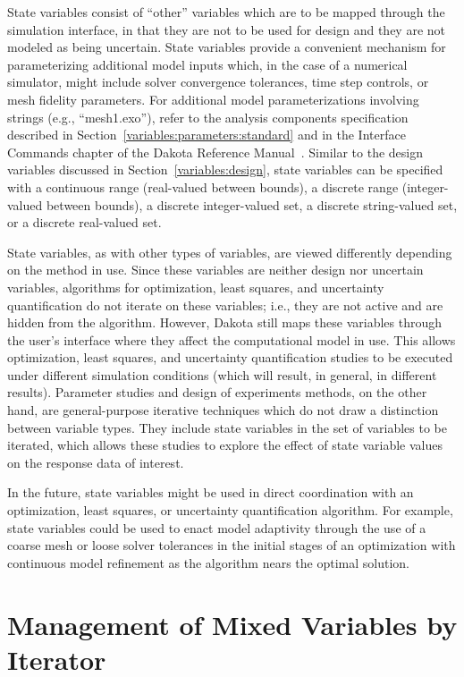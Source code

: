 State variables consist of ``other'' variables which are to be mapped
through the simulation interface, in that they are not to be used for
design and they are not modeled as being uncertain. State variables
provide a convenient mechanism for parameterizing additional model
inputs which, in the case of a numerical simulator, might include
solver convergence tolerances, time step controls, or mesh fidelity
parameters. For additional model parameterizations involving strings
(e.g., ``mesh1.exo''), refer to the analysis components specification
described in Section~\ref{variables:parameters:standard} and in the
Interface Commands chapter of the Dakota Reference
Manual~\cite{RefMan}.  Similar to the design variables discussed in
Section~\ref{variables:design}, state variables can be specified with
a continuous range (real-valued between bounds), a discrete range
(integer-valued between bounds), a discrete integer-valued set, a
discrete string-valued set, or a discrete real-valued set.

State variables, as with other types of variables, are viewed
differently depending on the method in use. Since these variables are
neither design nor uncertain variables, algorithms for optimization,
least squares, and uncertainty quantification do not iterate on these
variables; i.e., they are not active and are hidden from the
algorithm. However, Dakota still maps these variables through the
user's interface where they affect the computational model in use.
This allows optimization, least squares, and uncertainty
quantification studies to be executed under different simulation
conditions (which will result, in general, in different results).
Parameter studies and design of experiments methods, on the other
hand, are general-purpose iterative techniques which do not draw a
distinction between variable types. They include state variables in
the set of variables to be iterated, which allows these studies to
explore the effect of state variable values on the response data of
interest.

In the future, state variables might be used in direct coordination
with an optimization, least squares, or uncertainty quantification
algorithm. For example, state variables could be used to enact model
adaptivity through the use of a coarse mesh or loose solver tolerances
in the initial stages of an optimization with continuous model
refinement as the algorithm nears the optimal solution.

\section{Management of Mixed Variables by Iterator}\label{variables:mixed}

